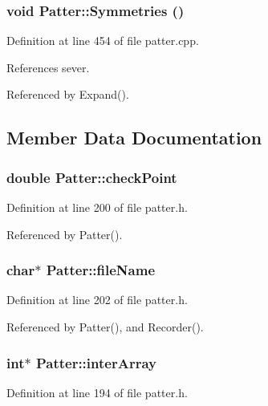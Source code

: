 \subsubsection{\setlength{\rightskip}{0pt plus 5cm}void Patter::Symmetries ()\hspace{0.3cm}{\tt  [private]}}\label{classPatter_d8}




Definition at line 454 of file patter.cpp.

References sever.

Referenced by Expand().

\subsection{Member Data Documentation}
\subsubsection{\setlength{\rightskip}{0pt plus 5cm}double {\bf Patter::check\-Point}\hspace{0.3cm}{\tt  [private]}}\label{classPatter_r5}




Definition at line 200 of file patter.h.

Referenced by Patter().
\subsubsection{\setlength{\rightskip}{0pt plus 5cm}char$\ast$ {\bf Patter::file\-Name}\hspace{0.3cm}{\tt  [private]}}\label{classPatter_r6}




Definition at line 202 of file patter.h.

Referenced by Patter(), and Recorder().
\subsubsection{\setlength{\rightskip}{0pt plus 5cm}int$\ast$ {\bf Patter::inter\-Array}\hspace{0.3cm}{\tt  [private]}}\label{classPatter_r0}




Definition at line 194 of file patter.h.

